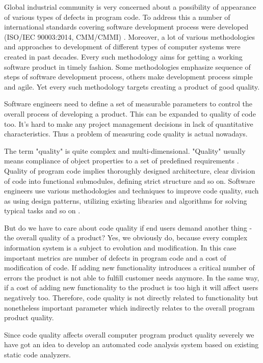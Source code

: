 \documentclass[runningheads,a4paper]{llncs}
\begin{document}
Global industrial community is very concerned about a possibility of appearance
of various types of defects in program code. To address this a number of
international standards covering software development process
were developed (ISO/IEC 90003:2014, CMM/CMMI) \cite{item02}. Moreover, a lot of
various methodologies and approaches to development of different types
of computer systems were created in past decades. Every such methodology aims
for getting a working software product in timely fashion. Some methodologies
emphasize sequence of steps of software development process, others make
development process simple and agile. Yet every such methodology targets
creating a product of good quality.

Software engineers need to define a set of measurable parameters to control the overall process
of developing a product. This can be expanded to quality of code too. It's hard
to make any project management decisions in lack of quantitative
characteristics. Thus a problem of measuring code quality is actual nowadays.

The term "quality" is quite complex and multi-dimensional. "Quality" usually
means compliance of object properties to a set of predefined requirements \cite{item03}.
Quality of program code implies thoroughly designed architecture, clear division
of code into functional submodules, defining strict structure and so on.
Software engineers use various methodologies and techniques to improve code
quality, such as using design patterns, utilizing existing libraries and
algorithms for solving typical tasks and so on \cite{item04}.

But do we have to care about code quality if end users demand another
thing - the overall quality of a product? Yes, we obviously do, because every
complex information system is a subject to evolution and modification. In this
case important metrics are number of defects in program code and a cost of
modification of code. If adding new functionality introduces a critical number
of errors the product is not able to fulfill customer needs anymore. In the
same way, if a cost of adding new functionality to the product is too high
it will affect users negatively too. Therefore, code quality is not directly
related to functionality but nonetheless important parameter which indirectly
relates to the overall program product quality.

Since code quality affects overall computer program product quality severely
we have got an idea to develop an automated code analysis system based on
existing static code analyzers.
\end{document}
